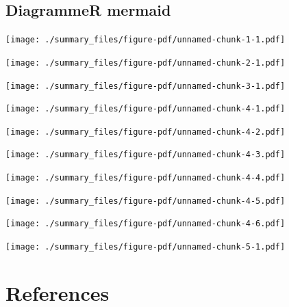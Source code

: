 \documentclass[
  letterpaper,
]{scrbook}
\newlength{\cslhangindent}
\newlength{\cslentryspacingunit} %
\newenvironment{CSLReferences}[2] %
 {%
  \setlength{\parindent}{0pt}
  \ifodd #1
  \let\oldpar\par
  \def\par{\hangindent=\cslhangindent\oldpar}
  \fi
  \setlength{\parskip}{#2\cslentryspacingunit}
 }%
 {}
\begin{document}
\hypertarget{diagrammer-mermaid}{%
\section{DiagrammeR mermaid}\label{diagrammer-mermaid}}

\texttt{[image: ./summary\_files/figure-pdf/unnamed-chunk-1-1.pdf]}

\texttt{[image: ./summary\_files/figure-pdf/unnamed-chunk-2-1.pdf]}

\texttt{[image: ./summary\_files/figure-pdf/unnamed-chunk-3-1.pdf]}

\texttt{[image: ./summary\_files/figure-pdf/unnamed-chunk-4-1.pdf]}

\texttt{[image: ./summary\_files/figure-pdf/unnamed-chunk-4-2.pdf]}

\texttt{[image: ./summary\_files/figure-pdf/unnamed-chunk-4-3.pdf]}

\texttt{[image: ./summary\_files/figure-pdf/unnamed-chunk-4-4.pdf]}

\texttt{[image: ./summary\_files/figure-pdf/unnamed-chunk-4-5.pdf]}

\texttt{[image: ./summary\_files/figure-pdf/unnamed-chunk-4-6.pdf]}

\texttt{[image: ./summary\_files/figure-pdf/unnamed-chunk-5-1.pdf]}


\hypertarget{references}{%
\chapter*{References}\label{references}}


\hypertarget{refs}{}
\begin{CSLReferences}{0}{0}
\end{CSLReferences}


\backmatter

\printindex
\end{document}
